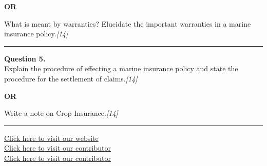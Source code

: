 \documentclass[11pt,a4paper]{article}
\newcommand{\pts}[1]{\hfill   \textit{[#1]}}
\begin{document}
\centerline{   \textbf{OR}}

What is meant by warranties? Elucidate the important warranties in a marine insurance policy.\pts{14}

\medskip\rule{\linewidth}{0.2pt}




\noindent   \textbf{Question 5.} \\
Explain the procedure of effecting a marine insurance policy and state the procedure for the settlement of claims.\pts{14}

\centerline{   \textbf{OR}}

Write a note on Crop Insurance.\pts{14}

\vfill
\rule{\linewidth}{0.4pt}

\begin{center}\small
\href{https://bhu-exam.vercel.app/}{Click here to visit our website}\\[4pt]
\href{https://me-aryan.vercel.app/}{Click here to visit our contributor}\\[4pt]
\href{https://quashan-me.vercel.app/}{Click here to visit our contributor}
\end{center}
\end{document}
